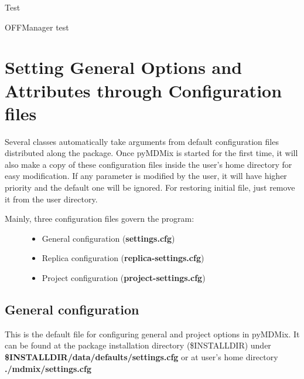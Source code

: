 \documentclass[letterpaper,10pt,english]{sphinxmanual}
\begin{document}
\begin{fulllineitems}
\label{OFFManager:pyMDMix.OFFManager.Test}
Test

\begin{fulllineitems}
\label{OFFManager:pyMDMix.OFFManager.Test.test_OFFManager}
OFFManager test

\end{fulllineitems}


\end{fulllineitems}



\chapter{Setting General Options and Attributes through Configuration files}
\label{settings::doc}\label{settings:setting-general-options-and-attributes-through-configuration-files}
Several classes automatically take arguments from default configuration files distributed along the package.
Once pyMDMix is started for the first time, it will also make a copy of these configuration files inside the user's home directory
for easy modification. If any parameter is modified by the user, it will have higher priority and the default one will be ignored.
For restoring initial file, just remove it from the user directory.
\begin{description}
\item[{Mainly, three configuration files govern the program:}] \leavevmode\begin{itemize}
\item {} 
General configuration (\textbf{settings.cfg})

\item {} 
Replica configuration (\textbf{replica-settings.cfg})

\item {} 
Project configuration (\textbf{project-settings.cfg})

\end{itemize}

\end{description}


\section{General configuration}
\label{settings:general-configuration}
This is the default file for configuring general and project options in pyMDMix.
It can be found at the package installation directory (\$INSTALLDIR) under \textbf{\$INSTALLDIR/data/defaults/settings.cfg}
or at user's home directory \textbf{./mdmix/settings.cfg}
\end{document}
